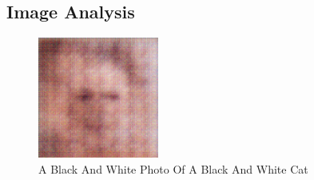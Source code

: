\documentclass{article}%
\begin{document}
%
\subsection{Image Analysis}%
\label{subsec:ImageAnalysis}%


\begin{figure}[h!]%
\centering%
\includegraphics[width=150px]{500_fake_images/samples_5_203.png}%
\caption{A Black And White Photo Of A Black And White Cat}%
\end{figure}

%
\end{document}
